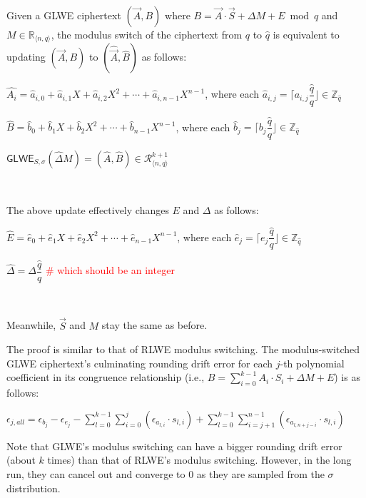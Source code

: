 \begin{tcolorbox}[title={\textbf{\tboxlabel{\ref*{subsec:modulus-switch-glwe}} GLWE Modulus Switching}}]

Given a GLWE ciphertext $(\vec A, B)$ where $B = \vec A\cdot \vec S + \Delta M + E \bmod q$ and $M \in \mathbb{R}_{\langle n, q \rangle}$, the modulus switch of the ciphertext from $q$ to $\hat q$ is equivalent to updating $(\vec A, B)$ to $(\hat{\vec A}, \hat B)$ as follows:


$\hat{A_i} = \hat{a}_{i,0} + \hat{a}_{i,1}X + \hat{a}_{i,2}X^2 + \cdots + \hat{a}_{i, {n-1}}X^{n-1}$, where each $\hat{a}_{i,j} = \Big\lceil a_{i,j}\dfrac{\hat{q}}{q} \Big\rfloor \in \mathbb{Z}_{\hat{q}}$ 


$\hat{B} = \hat{b}_0 + \hat{b}_1X + \hat{b}_2X^2 + \cdots + \hat{b}_{n-1}X^{n-1}$, where each $\hat{b}_j = \Big\lceil b_j\dfrac{\hat{q}}{q} \Big\rfloor \in \mathbb{Z}_{\hat{q}}$

$\textsf{GLWE}_{{S},\sigma}(\hat{\Delta}  M) = (\hat{A}, \hat{B}) \in \mathcal{R}_{\langle n, q \rangle}^{k+1}$ 

$ $

The above update effectively changes $E$ and $\Delta$ as follows:

$\hat{E} = \hat{e}_0 + \hat{e}_1X + \hat{e}_2X^2 + \cdots + \hat{e}_{n-1}X^{n-1}$, where each $\hat{e}_j = \Big\lceil e_j\dfrac{\hat{q}}{q} \Big\rfloor \in \mathbb{Z}_{\hat{q}}$


$\hat{\Delta} = \Delta\dfrac{\hat{q}}{q}$ \textcolor{red}{\# which should be an integer}

$ $


Meanwhile, $\vec{S}$ and $M$ stay the same as before.



\end{tcolorbox}

The proof is similar to that of RLWE modulus switching. The modulus-switched GLWE ciphertext's culminating rounding drift error for each $j$-th polynomial coefficient in its congruence relationship (i.e., $B = \sum\limits_{i=0}^{k-1}A_i\cdot S_i + \Delta M + E$) is as follows:

$\epsilon_{j, all} = \epsilon_{b_j} - \epsilon_{e_j}
- \sum\limits_{l=0}^{k-1}\sum\limits_{i=0}^{j}(\epsilon_{a_{l,i}} \cdot s_{l,i})
+ \sum\limits_{l=0}^{k-1}\sum\limits_{i=j+1}^{n-1}(\epsilon_{a_{l,n+j-i}} \cdot s_{l,i})$

Note that GLWE's modulus switching can have a bigger rounding drift error (about $k$ times) than that of RLWE's modulus switching. However, in the long run, they can cancel out and converge to 0 as they are sampled from the $\sigma$ distribution.